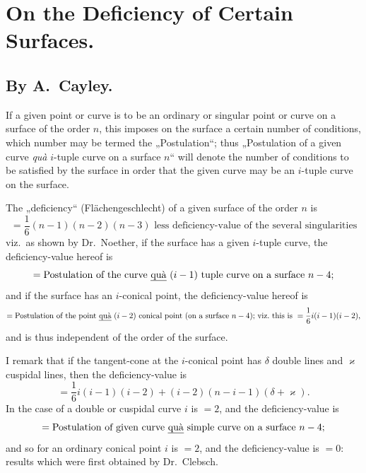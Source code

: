 \documentclass{article}
\begin{document}
\section*{On the Deficiency of Certain Surfaces.}

\subsection*{By A.~Cayley.}

If a given point or curve is to be an ordinary or singular point or curve on a surface of the order $n$, this imposes on the surface a certain number of conditions, which number may be termed the „Postulation“; thus „Postulation of a given curve \emph{quà} $i$-tuple curve on a surface $n$“ will denote the number of conditions to be satisfied by the surface in order that the given curve may be an $i$-tuple curve on the surface.

The „deficiency“ (Flächengeschlecht) of a given surface of the order $n$ is
\[
= \frac{1}{6} (n - 1) (n - 2) (n - 3) \text{ less deficiency-value of the several singularities}
\]
viz.\ as shown by Dr.~Noether, if the surface has a given $i$-tuple curve, the deficiency-value hereof is
\[
= \text{Postulation of the curve \emph{quà} } (i - 1) \text{ tuple curve on a surface } n - 4\text{;}
\]
and if the surface has an $i$-conical point, the deficiency-value hereof is
\[
= \text{Postulation of the point \emph{quà} } (i - 2) \text{ conical point (on a surface } n - 4\text{); viz.\ this is } = \frac{1}{6} i(i - 1)(i - 2)\text{,}
\]
and is thus independent of the order of the surface.

I remark that if the tangent-cone at the $i$-conical point has $\delta$ double lines and $\varkappa$ cuspidal lines, then the deficiency-value is
\[
= \frac{1}{6} i(i - 1)(i - 2) + (i - 2)(n - i - 1)(\delta + \varkappa).
\]
In the case of a double or cuspidal curve $i$ is $= 2$, and the deficiency-value is
\[
= \text{Postulation of given curve \emph{quà} simple curve on a surface } n - 4\text{;}
\]
and so for an ordinary conical point $i$ is $= 2$, and the deficiency-value is $= 0$: results which were first obtained by Dr.~Clebsch.
\end{document}

